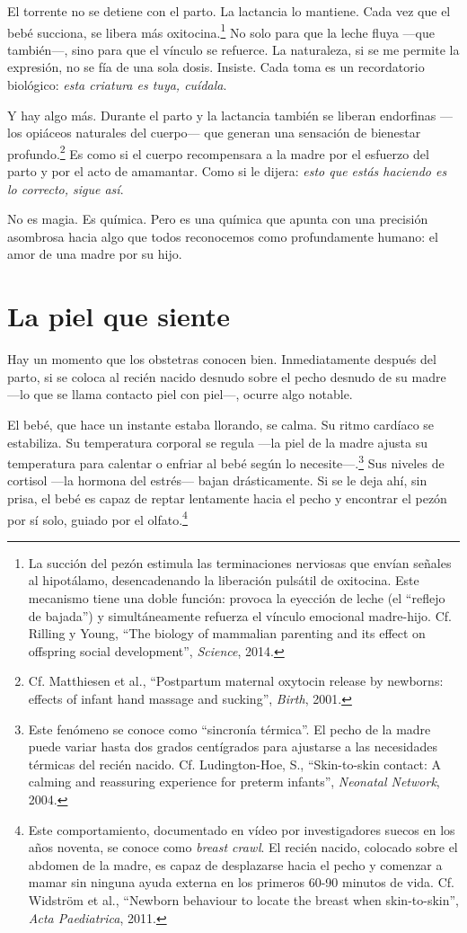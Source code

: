 El torrente no se detiene con el parto. La lactancia lo mantiene. Cada vez que el bebé succiona, se libera más oxitocina.\footnote{La succión del pezón estimula las terminaciones nerviosas que envían señales al hipotálamo, desencadenando la liberación pulsátil de oxitocina. Este mecanismo tiene una doble función: provoca la eyección de leche (el ``reflejo de bajada'') y simultáneamente refuerza el vínculo emocional madre-hijo. Cf. Rilling y Young, ``The biology of mammalian parenting and its effect on offspring social development'', \textit{Science}, 2014.} No solo para que la leche fluya ---que también---, sino para que el vínculo se refuerce. La naturaleza, si se me permite la expresión, no se fía de una sola dosis. Insiste. Cada toma es un recordatorio biológico: \textit{esta criatura es tuya, cuídala}.

Y hay algo más. Durante el parto y la lactancia también se liberan endorfinas ---los opiáceos naturales del cuerpo--- que generan una sensación de bienestar profundo.\footnote{Cf. Matthiesen et al., ``Postpartum maternal oxytocin release by newborns: effects of infant hand massage and sucking'', \textit{Birth}, 2001.} Es como si el cuerpo recompensara a la madre por el esfuerzo del parto y por el acto de amamantar. Como si le dijera: \textit{esto que estás haciendo es lo correcto, sigue así}.

No es magia. Es química. Pero es una química que apunta con una precisión asombrosa hacia algo que todos reconocemos como profundamente humano: el amor de una madre por su hijo.

\section{La piel que siente}

Hay un momento que los obstetras conocen bien. Inmediatamente después del parto, si se coloca al recién nacido desnudo sobre el pecho desnudo de su madre ---lo que se llama contacto piel con piel---, ocurre algo notable.

El bebé, que hace un instante estaba llorando, se calma. Su ritmo cardíaco se estabiliza. Su temperatura corporal se regula ---la piel de la madre ajusta su temperatura para calentar o enfriar al bebé según lo necesite---.\footnote{Este fenómeno se conoce como ``sincronía térmica''. El pecho de la madre puede variar hasta dos grados centígrados para ajustarse a las necesidades térmicas del recién nacido. Cf. Ludington-Hoe, S., ``Skin-to-skin contact: A calming and reassuring experience for preterm infants'', \textit{Neonatal Network}, 2004.} Sus niveles de cortisol ---la hormona del estrés--- bajan drásticamente. Si se le deja ahí, sin prisa, el bebé es capaz de reptar lentamente hacia el pecho y encontrar el pezón por sí solo, guiado por el olfato.\footnote{Este comportamiento, documentado en vídeo por investigadores suecos en los años noventa, se conoce como \textit{breast crawl}. El recién nacido, colocado sobre el abdomen de la madre, es capaz de desplazarse hacia el pecho y comenzar a mamar sin ninguna ayuda externa en los primeros 60-90 minutos de vida. Cf. Widström et al., ``Newborn behaviour to locate the breast when skin-to-skin'', \textit{Acta Paediatrica}, 2011.}

